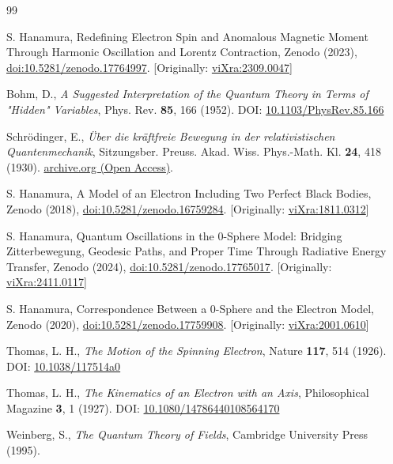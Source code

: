 \documentclass[%
 reprint,
 amsmath,amssymb,
 aps,
]{revtex4-1}
\numberwithin{equation}{section}%
\begin{document}
\begin{thebibliography}{99}

S. Hanamura, Redefining Electron Spin and Anomalous Magnetic Moment Through Harmonic Oscillation and Lorentz Contraction, Zenodo (2023), \href{https://doi.org/10.5281/zenodo.17764997}{doi:10.5281/zenodo.17764997}. [Originally: \href{https://vixra.org/abs/2309.0047}{viXra:2309.0047}]

 Bohm, D., 
\textit{A Suggested Interpretation of the Quantum Theory in Terms of "Hidden" Variables}, 
Phys. Rev. \textbf{85}, 166 (1952). DOI: \href{https://doi.org/10.1103/PhysRev.85.166}{10.1103/PhysRev.85.166}

Schr\"{o}dinger, E.,
\textit{Über die kräftfreie Bewegung in der relativistischen Quantenmechanik}, 
Sitzungsber. Preuss. Akad. Wiss. Phys.-Math. Kl. \textbf{24}, 418 (1930). 
\href{https://archive.org/details/uberderkrarelativistischenquantenmechanikschrodinger19300717english}{archive.org  (Open Access)}.

S. Hanamura, A Model of an Electron Including Two Perfect Black Bodies, Zenodo (2018), \href{https://doi.org/10.5281/zenodo.16759284}{doi:10.5281/zenodo.16759284}. [Originally: \href{https://vixra.org/abs/1811.0312}{viXra:1811.0312}]

S. Hanamura, Quantum Oscillations in the 0-Sphere Model: Bridging Zitterbewegung, Geodesic Paths, and Proper Time Through Radiative Energy Transfer, Zenodo (2024), \href{https://doi.org/10.5281/zenodo.17765017}{doi:10.5281/zenodo.17765017}. [Originally: \href{https://vixra.org/abs/2411.0117}{viXra:2411.0117}]

S. Hanamura, Correspondence Between a 0-Sphere and the Electron Model, Zenodo (2020), \href{https://doi.org/10.5281/zenodo.17759908}{doi:10.5281/zenodo.17759908}. [Originally: \href{https://vixra.org/abs/2001.0610}{viXra:2001.0610}]

 Thomas, L. H., 
\textit{The Motion of the Spinning Electron}, 
Nature \textbf{117}, 514 (1926). DOI: \href{https://doi.org/10.1038/117514a0}{10.1038/117514a0}

 Thomas, L. H., 
\textit{The Kinematics of an Electron with an Axis}, 
Philosophical Magazine \textbf{3}, 1 (1927). DOI: \href{https://doi.org/10.1080/14786440108564170}{10.1080/14786440108564170}

 Weinberg, S., 
\textit{The Quantum Theory of Fields}, Cambridge University Press (1995).


\end{thebibliography}
\end{document}
